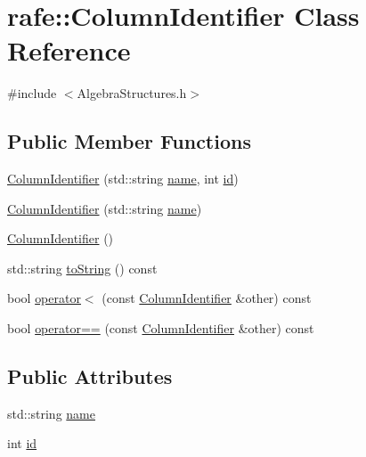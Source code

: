 \hypertarget{classrafe_1_1_column_identifier}{\section{rafe\+:\+:Column\+Identifier Class Reference}
\label{classrafe_1_1_column_identifier}
}


{\ttfamily \#include $<$Algebra\+Structures.\+h$>$}

\subsection*{Public Member Functions}
\begin{DoxyCompactItemize}
\item 
\hyperlink{classrafe_1_1_column_identifier_a9893d91ff339d89a2d032adfb63aa11d}{Column\+Identifier} (std\+::string \hyperlink{classrafe_1_1_column_identifier_a65aaf13619c20f17be5f8bdda2c6d28f}{name}, int \hyperlink{classrafe_1_1_column_identifier_afa735a6e57d40b1d7e25c6cc781d3a4d}{id})
\item 
\hyperlink{classrafe_1_1_column_identifier_ab1421d1d15f6d4bb548b7c6727121773}{Column\+Identifier} (std\+::string \hyperlink{classrafe_1_1_column_identifier_a65aaf13619c20f17be5f8bdda2c6d28f}{name})
\item 
\hyperlink{classrafe_1_1_column_identifier_a48f0facd564ddc904cc43c56bfff249f}{Column\+Identifier} ()
\item 
std\+::string \hyperlink{classrafe_1_1_column_identifier_a60033c2c50b301dd5582957978bba2e5}{to\+String} () const 
\item 
bool \hyperlink{classrafe_1_1_column_identifier_a2bfacd7aa1922c35ea93127e3f4b290f}{operator$<$} (const \hyperlink{classrafe_1_1_column_identifier}{Column\+Identifier} \&other) const 
\item 
bool \hyperlink{classrafe_1_1_column_identifier_aa0d0f99b98e2d48b9dacfc3a430a9e52}{operator==} (const \hyperlink{classrafe_1_1_column_identifier}{Column\+Identifier} \&other) const 
\end{DoxyCompactItemize}
\subsection*{Public Attributes}
\begin{DoxyCompactItemize}
\item 
std\+::string \hyperlink{classrafe_1_1_column_identifier_a65aaf13619c20f17be5f8bdda2c6d28f}{name}
\item 
int \hyperlink{classrafe_1_1_column_identifier_afa735a6e57d40b1d7e25c6cc781d3a4d}{id}
\end{DoxyCompactItemize}


